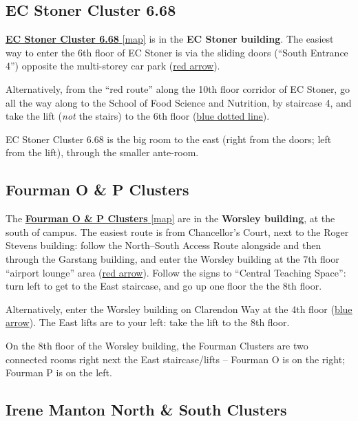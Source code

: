 \documentclass[
  a4paper,
]{book}
\theoremstyle{definition}
\theoremstyle{definition}
\theoremstyle{definition}
\theoremstyle{definition}
\theoremstyle{remark}
\begin{document}
\hypertarget{stoner}{%
\subsection*{EC Stoner Cluster 6.68}\label{stoner}}

\href{ecstoner.png}{\textbf{EC Stoner Cluster 6.68} {[}map{]}} is in the \textbf{EC Stoner building}. The easiest way to enter the 6th floor of EC Stoner is via the sliding doors (``South Entrance 4'') opposite the multi-storey car park (\href{ecstoner.png}{red arrow}).

Alternatively, from the ``red route'' along the 10th floor corridor of EC Stoner, go all the way along to the School of Food Science and Nutrition, by staircase 4, and take the lift (\emph{not} the stairs) to the 6th floor (\href{ecstoner.png}{blue dotted line}).

EC Stoner Cluster 6.68 is the big room to the east (right from the doors; left from the lift), through the smaller ante-room.

\hypertarget{fourman}{%
\subsection*{Fourman O \& P Clusters}\label{fourman}}

The \href{fourman.png}{\textbf{Fourman O \& P Clusters} {[}map{]}} are in the \textbf{Worsley building}, at the south of campus. The easiest route is from Chancellor's Court, next to the Roger Stevens building: follow the North--South Access Route alongside and then through the Garstang building, and enter the Worsley building at the 7th floor ``airport lounge'' area (\href{fourman.png}{red arrow}). Follow the signs to ``Central Teaching Space'': turn left to get to the East staircase, and go up one floor the the 8th floor.

Alternatively, enter the Worsley building on Clarendon Way at the 4th floor (\href{fourman.png}{blue arrow}). The East lifts are to your left: take the lift to the 8th floor.

On the 8th floor of the Worsley building, the Fourman Clusters are two connected rooms right next the East staircase/lifts -- Fourman O is on the right; Fourman P is on the left.

\hypertarget{manton}{%
\subsection*{Irene Manton North \& South Clusters}\label{manton}}
\end{document}
